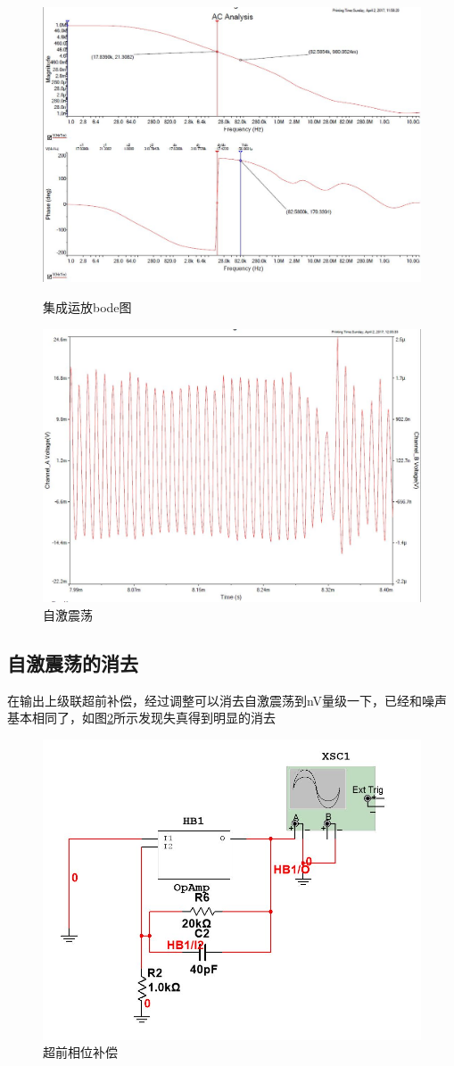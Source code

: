 \documentclass[UTF8,a4paper]{ctexart}
\begin{document}
\begin{figure}
\centering
\includegraphics[width=\textwidth]{ffail.jpg}
\caption{集成运放bode图}
\label{bode}
\includegraphics[width=\textwidth]{self.jpg}
\caption{自激震荡}
\label{exp}
\end{figure}
\subsection{自激震荡的消去}
在输出上级联超前补偿，经过调整可以消去自激震荡到nV量级一下，已经和噪声基本相同了，如图\ref{slu}所示发现失真得到明显的消去
\begin{figure}
\centering
\includegraphics[width=\textwidth]{ok.jpg}
\caption{超前相位补偿}
\label{slu}
\end{figure}
\end{document}
